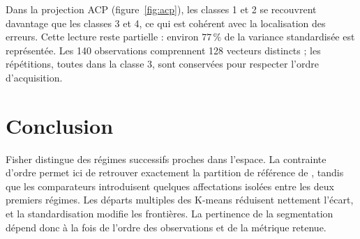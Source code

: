 Dans la projection ACP (figure~\ref{fig:acp}), les classes 1 et 2 se recouvrent
davantage que les classes 3 et 4, ce qui est cohérent avec la localisation des
erreurs. Cette lecture reste partielle : environ $77\,\%$ de la variance
standardisée est représentée. Les 140 observations comprennent 128 vecteurs
distincts ; les répétitions, toutes dans la classe 3, sont conservées pour
respecter l'ordre d'acquisition.

\section{Conclusion}
Fisher distingue des régimes successifs proches dans l'espace.
La contrainte d'ordre permet ici de retrouver exactement
la partition de référence de , tandis que les comparateurs
introduisent quelques affectations isolées entre les deux premiers régimes.
Les départs multiples des K-means réduisent nettement l'écart, et la
standardisation modifie les frontières. La pertinence de la segmentation dépend
donc à la fois de l'ordre des observations et de la métrique retenue.
